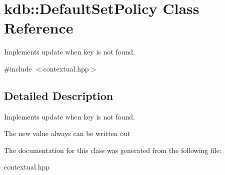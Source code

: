 \hypertarget{classkdb_1_1DefaultSetPolicy}{\section{kdb\-:\-:Default\-Set\-Policy Class Reference}
\label{classkdb_1_1DefaultSetPolicy}
}


Implements update when key is not found.  




{\ttfamily \#include $<$contextual.\-hpp$>$}



\subsection{Detailed Description}
Implements update when key is not found. 

The new value always can be written out 

The documentation for this class was generated from the following file\-:\begin{DoxyCompactItemize}
\item 
contextual.\-hpp\end{DoxyCompactItemize}
